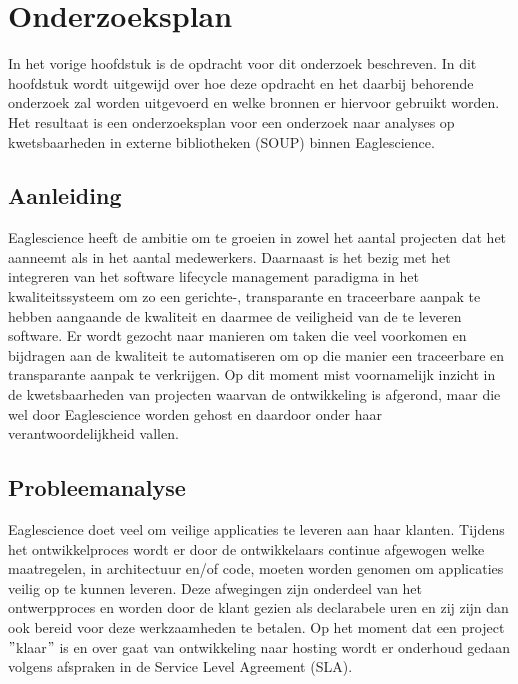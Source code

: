 \chapter{Onderzoeksplan}\label{ch:onderzoekPlan}

In het vorige hoofdstuk is de opdracht voor dit onderzoek beschreven. In dit hoofdstuk wordt uitgewijd over hoe deze opdracht en het daarbij behorende onderzoek zal worden uitgevoerd en welke bronnen er hiervoor gebruikt worden. Het resultaat is een onderzoeksplan voor een onderzoek naar analyses op kwetsbaarheden in externe bibliotheken (SOUP) binnen Eaglescience.


\section{Aanleiding}\label{sec:OP_aanleiding}
Eaglescience heeft de ambitie om te groeien in zowel het aantal projecten dat het aanneemt als in het aantal medewerkers. Daarnaast is het bezig met het integreren van het software lifecycle management paradigma in het kwaliteitssysteem om zo een gerichte-, transparante en traceerbare aanpak te hebben aangaande de kwaliteit en daarmee de veiligheid van de te leveren software. Er wordt gezocht naar manieren om taken die veel voorkomen en bijdragen aan de kwaliteit te automatiseren om op die manier een traceerbare en transparante aanpak te verkrijgen. Op dit moment mist voornamelijk inzicht in de kwetsbaarheden van projecten waarvan de ontwikkeling is afgerond, maar die wel door Eaglescience worden gehost en daardoor onder haar verantwoordelijkheid vallen.


\section{Probleemanalyse}\label{sec:probleemanalyse}
Eaglescience doet veel om veilige applicaties te leveren aan haar klanten. Tijdens het ontwikkelproces wordt er door de ontwikkelaars continue afgewogen welke maatregelen, in architectuur en/of code, moeten worden genomen om applicaties veilig op te kunnen leveren. Deze afwegingen zijn onderdeel van het ontwerpproces en worden door de klant gezien als declarabele uren en zij zijn dan ook bereid voor deze werkzaamheden te betalen. Op het moment dat een project $"$klaar$"$ is en over gaat van ontwikkeling naar hosting wordt er onderhoud gedaan volgens afspraken in de Service Level Agreement (SLA).

